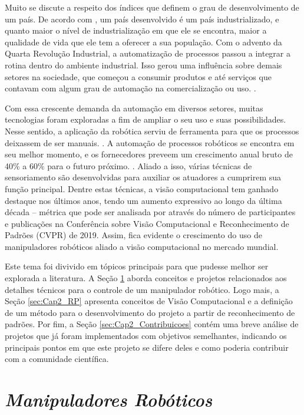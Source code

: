 Muito se discute a respeito dos índices que definem o grau de desenvolvimento de um país. De acordo com \cite{paranhos2007gestao}, um país desenvolvido é um país industrializado, e quanto maior o nível de industrialização em que ele se encontra, maior a qualidade de vida que ele tem a oferecer a sua população. Com o advento da Quarta Revolução Industrial, a automatização de processos passou a integrar a rotina dentro do ambiente industrial. Isso gerou uma influência sobre demais setores na sociedade, que começou a consumir produtos e até serviços que contavam com algum grau de automação na comercialização ou uso. \cite{schwab2019quarta}.

Com essa crescente demanda da automação em diversos setores, muitas tecnologias foram exploradas a fim de ampliar o seu uso e suas possibilidades. Nesse sentido, a aplicação da robótica serviu de ferramenta para que os processos deixassem de ser manuais. \cite{bastos2014aplicaccao}. A automação de processos robóticos se encontra em seu melhor momento, e os fornecedores preveem um crescimento anual bruto de 40\% a 60\% para o futuro próximo. \cite{saukkonen2020robotic}. Aliado a isso, várias técnicas de sensoriamento são desenvolvidas para auxiliar os atuadores a cumprirem sua função principal. Dentre estas técnicas, a visão computacional tem ganhado destaque nos últimos anos, tendo um aumento expressivo ao longo da última década – métrica que pode ser analisada por \cite{su2021affective} através do número de participantes e publicações na Conferência sobre Visão Computacional e Reconhecimento de Padrões (CVPR) de 2019. Assim, fica evidente o crescimento do uso de manipuladores robóticos aliado a visão computacional no mercado mundial.

Este tema foi divivido em tópicos principais para que pudesse melhor ser explorada a literatura. A Seção \ref{sec:Cap2_MR} aborda conceitos e projetos relacionados aos detalhes técnicos para o controle de um manipulador robótico. Logo mais, a Seção \ref{sec:Cap2_RP} apresenta conceitos de Visão Computacional e a definição de um método para o desenvolvimento do projeto a partir de reconhecimento de padrões. Por fim, a Seção \ref{sec:Cap2_Contribuicoes} contém uma breve análise de projetos que já foram implementados com objetivos semelhantes, indicando os principais pontos em que este projeto se difere deles e como poderia contribuir com a comunidade científica.


\section{\textit{Manipuladores Robóticos}}\label{sec:Cap2_MR}

